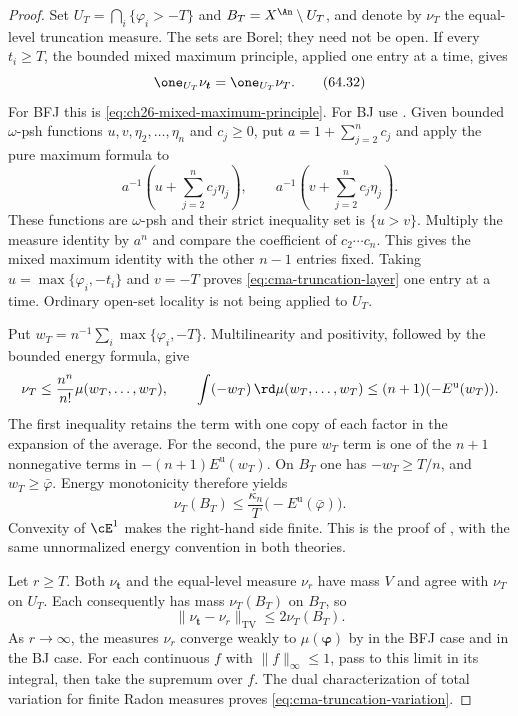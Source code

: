 \begin{proof}
Set $U_T=\bigcap_i\{\varphi_i>-T\}$ and $B_T=X^{\An}\setminus U_T$, and denote by $\nu_T$ the equal-level truncation measure. The sets are Borel; they need not be open. If every $t_i\geq T$, the bounded mixed maximum principle, applied one entry at a time, gives
\[
                    \one_{U_T}\nu_{\boldsymbol t}
                         =\one_{U_T}\nu_T.
\tag{64.32}\label{eq:cma-truncation-layer}
\]
For BFJ this is \eqref{eq:ch26-mixed-maximum-principle}. For BJ use \cite[Theorem~7.40]{BJ22}. Given bounded $\omega$-psh functions $u,v,\eta_2,\ldots,\eta_n$ and $c_j\geq0$, put $a=1+\sum_{j=2}^n c_j$ and apply the pure maximum formula to
\[
       a^{-1}\left(u+\sum_{j=2}^n c_j\eta_j\right),
       \qquad
       a^{-1}\left(v+\sum_{j=2}^n c_j\eta_j\right).
\]
These functions are $\omega$-psh and their strict inequality set is $\{u>v\}$. Multiply the measure identity by $a^n$ and compare the coefficient of $c_2\cdots c_n$. This gives the mixed maximum identity with the other $n-1$ entries fixed. Taking $u=\max\{\varphi_i,-t_i\}$ and $v=-T$ proves \eqref{eq:cma-truncation-layer} one entry at a time. Ordinary open-set locality is not being applied to $U_T$.

Put $w_T=n^{-1}\sum_i\max\{\varphi_i,-T\}$. Multilinearity and positivity, followed by the bounded energy formula, give
\[
 \nu_T\leq\frac{n^n}{n!}\mu(w_T,\ldots,w_T),\qquad
 \int(-w_T)\,\rd\mu(w_T,\ldots,w_T)
       \leq(n+1)(-E^{\mathrm u}(w_T)).
\]
The first inequality retains the term with one copy of each factor in the expansion of the average. For the second, the pure $w_T$ term is one of the $n+1$ nonnegative terms in $-(n+1)E^{\mathrm u}(w_T)$. On $B_T$ one has $-w_T\geq T/n$, and $w_T\geq\bar\varphi$. Energy monotonicity therefore yields
\[
 \nu_T(B_T)\leq\frac{\kappa_n}{T}
                         \bigl(-E^{\mathrm u}(\bar\varphi)\bigr).
\tag{64.33}\label{eq:cma-common-tail}
\]
Convexity of $\cE^1$ makes the right-hand side finite. This is the proof of , with the same unnormalized energy convention in both theories.

Let $r\geq T$. Both $\nu_{\boldsymbol t}$ and the equal-level measure $\nu_r$ have mass $V$ and agree with $\nu_T$ on $U_T$. Each consequently has mass $\nu_T(B_T)$ on $B_T$, so
\[
              \|\nu_{\boldsymbol t}-\nu_r\|_{\mathrm{TV}}
                         \leq2\nu_T(B_T).
\]
As $r\to\infty$, the measures $\nu_r$ converge weakly to $\mu(\boldsymbol\varphi)$ by  in the BFJ case and \cite[Proposition~7.19(iv)]{BJ22} in the BJ case. For each continuous $f$ with $\|f\|_\infty\leq1$, pass to this limit in its integral, then take the supremum over $f$. The dual characterization of total variation for finite Radon measures proves \eqref{eq:cma-truncation-variation}.
\end{proof}

